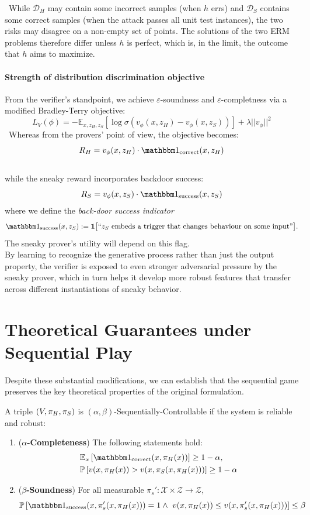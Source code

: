 \noindent~While $\mathcal D_H$ may contain some incorrect samples (when $h$ errs) and $\mathcal D_S$ contains some correct samples (when the attack passes all unit test instances), the two risks may disagree on a non-empty set of points.  The solutions of the two ERM problems therefore differ unless $h$ is perfect, which is, in the limit, the outcome that $h$ aims to maximize. 

\paragraph{Strength of distribution discrimination objective}
 From the verifier's standpoint, we achieve $\varepsilon$-soundness and $\varepsilon$-completness via a modified Bradley-Terry objective:
$$L_V(\phi) = -\mathbb{E}_{x,z_H,z_S}\left[\log \sigma(v_\phi(x, z_H) - v_\phi(x, z_S))\right] + \lambda ||v_\phi||^2$$
\noindent~Whereas from the provers' point of view, the objective becomes:
$$R_H = v_\phi(x, z_H) \cdot \corr(x, z_H)$$
\\
while the sneaky reward incorporates backdoor success:
$$R_S = v_\phi(x, z_S) \cdot \success(x, z_S)$$\noindent
\smallskip
where we define the \emph{back-door success indicator}
\[
  \success(x,z_S):=
    \mathbf 1\bigl[\text{``$z_S$ embeds a trigger that changes behaviour
                     on some input''}\bigr].
\]
The sneaky prover’s utility will depend on this flag.\\
By learning to recognize the generative process rather than just the output property, the verifier is exposed to even stronger adversarial pressure by the sneaky prover, which in turn helps it develop more robust features that transfer across different instantiations of sneaky behavior.

\section{Theoretical Guarantees under Sequential Play}
Despite these substantial modifications, we can establish that the sequential game preserves the key theoretical properties of the original formulation.
\begin{definition}
A triple $(V, \pi_H, \pi_S)$ is $(\alpha, \beta)$-Sequentially-Controllable if the system is reliable and robust:
\begin{enumerate}
    \item (\textbf{$\alpha$-Completeness}) The following statements hold:
    \begin{align*}
        &\mathbb{E}_x\left[\corr(x, \pi_H(x))\right] \geq 1 - \alpha, \\
        &\mathbb{P}\left[v(x, \pi_H(x)) > v(x, \pi_S(x, \pi_H(x)))\right] \geq 1 - \alpha
    \end{align*}
    \item (\textbf{$\beta$-Soundness}) For all measurable $\pi_s': \mathcal{X} \times \mathcal{Z} \to \mathcal{Z}$,
    \[
        \mathbb{P}\left[
            \success(x, \pi_s'(x, \pi_H(x))) = 1
            \wedge\ 
            v(x, \pi_H(x)) \leq v(x, \pi_s'(x, \pi_H(x)))
        \right] \leq \beta
    \]
\end{enumerate}
\end{definition}

